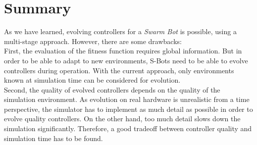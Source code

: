 \section{Summary}
As we have learned, evolving controllers for a \emph{Swarm Bot} is possible, using a multi-stage approach. However, there are some drawbacks:\\
First, the evaluation of the fitness function requires global information. But in order to be able to adapt to new environments, S-Bots need to be able to evolve controllers during operation. With the current approach, only environments known at simulation time can be considered for evolution.\\
Second, the quality of evolved controllers depends on the quality of the simulation environment. As evolution on real hardware is unrealistic from a time perspective, the simulator has to implement as much detail as possible in order to evolve quality controllers. On the other hand, too much detail slows down the simulation significantly. Therefore, a good tradeoff between controller quality and simulation time has to be found.